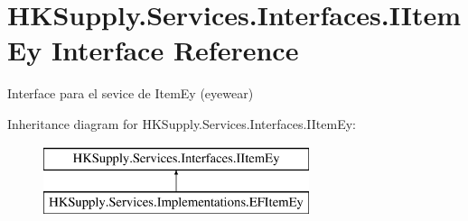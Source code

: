 \hypertarget{interface_h_k_supply_1_1_services_1_1_interfaces_1_1_i_item_ey}{}\section{H\+K\+Supply.\+Services.\+Interfaces.\+I\+Item\+Ey Interface Reference}
\label{interface_h_k_supply_1_1_services_1_1_interfaces_1_1_i_item_ey}


Interface para el sevice de Item\+Ey (eyewear)  


Inheritance diagram for H\+K\+Supply.\+Services.\+Interfaces.\+I\+Item\+Ey\+:\begin{figure}[H]
\begin{center}
\leavevmode
\includegraphics[height=2.000000cm]{interface_h_k_supply_1_1_services_1_1_interfaces_1_1_i_item_ey}
\end{center}
\end{figure}
